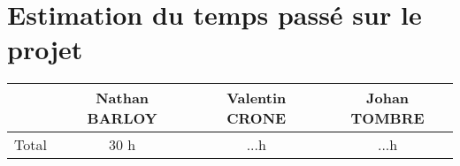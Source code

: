 \section{Estimation du temps passé sur le projet}
\begin{center}
\begin{tabular}{|c||c|c|c|}
	\hline
	& Nathan BARLOY & Valentin CRONE & Johan TOMBRE \\
	\hline
	Total & 30 h & ...h & ...h \\
	\hline
\end{tabular}
\end{center}
